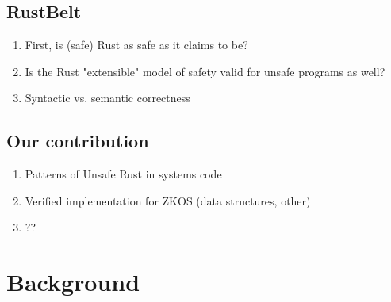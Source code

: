 \documentclass{article}
\begin{document}
\subsection{RustBelt}
\begin{enumerate}
    \item First, is (safe) Rust as safe as it claims to be?
    \item Is the Rust "extensible" model of safety valid for unsafe programs as well?
    \item Syntactic vs. semantic correctness
\end{enumerate}

\subsection{Our contribution}
\begin{enumerate}
    \item Patterns of Unsafe Rust in systems code
    \item Verified implementation for ZKOS (data structures, other)
    \item ??
\end{enumerate}


\section{Background}
\end{document}
